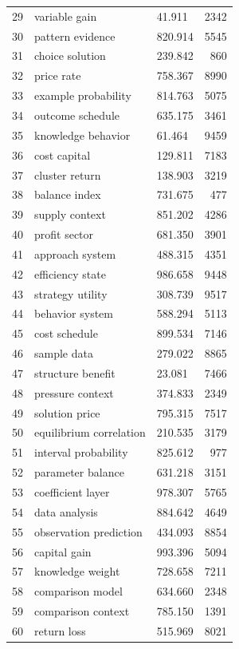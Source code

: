 \documentclass[11pt]{report}
\begin{document}
\begin{longtable}{rllr}
29 & variable gain & 41.911 & 2342 \\
30 & pattern evidence & 820.914 & 5545 \\
31 & choice solution & 239.842 & 860 \\
32 & price rate & 758.367 & 8990 \\
33 & example probability & 814.763 & 5075 \\
34 & outcome schedule & 635.175 & 3461 \\
35 & knowledge behavior & 61.464 & 9459 \\
36 & cost capital & 129.811 & 7183 \\
37 & cluster return & 138.903 & 3219 \\
38 & balance index & 731.675 & 477 \\
39 & supply context & 851.202 & 4286 \\
40 & profit sector & 681.350 & 3901 \\
41 & approach system & 488.315 & 4351 \\
42 & efficiency state & 986.658 & 9448 \\
43 & strategy utility & 308.739 & 9517 \\
44 & behavior system & 588.294 & 5113 \\
45 & cost schedule & 899.534 & 7146 \\
46 & sample data & 279.022 & 8865 \\
47 & structure benefit & 23.081 & 7466 \\
48 & pressure context & 374.833 & 2349 \\
49 & solution price & 795.315 & 7517 \\
50 & equilibrium correlation & 210.535 & 3179 \\
51 & interval probability & 825.612 & 977 \\
52 & parameter balance & 631.218 & 3151 \\
53 & coefficient layer & 978.307 & 5765 \\
54 & data analysis & 884.642 & 4649 \\
55 & observation prediction & 434.093 & 8854 \\
56 & capital gain & 993.396 & 5094 \\
57 & knowledge weight & 728.658 & 7211 \\
58 & comparison model & 634.660 & 2348 \\
59 & comparison context & 785.150 & 1391 \\
60 & return loss & 515.969 & 8021 \\
\end{longtable}
\end{document}
